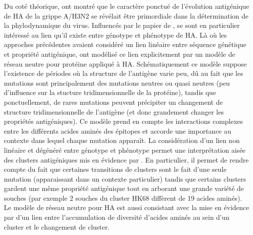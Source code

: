 Du coté théorique, \citet{Koelle2006} ont montré que le caractère
ponctué de l'évolution antigénique de HA de la grippe A/H3N2 se
révélait être primordiale dans la détermination de la phylodynamique
du virus.  Influencés par le papier de \citet{Smith2004},
\citet{Koelle2006} se sont en particulier intéressé au lien qu'il
existe entre génotype et phénotype de HA. Là où les approches
précédentes avaient considéré un lien linéaire entre séquence
génétique et propriété antigénique, \citet{Koelle2006} ont modélisé ce
lien explicitement par un modèle de réseau neutre pour protéine
appliqué à HA. Schématiquement ce modèle suppose l'existence de
périodes où la structure de l'antigène varie peu, dû au fait que les
mutations sont principalement des mutations neutres ou quasi neutres
(peu d'influence sur la stucture tridimensionnelle de la protéine),
tandis que ponctuellement, de rares mutations peuvent précipiter un
changement de structure tridimensionnelle de l'antigène (et donc
grandement changer les propriétés antigéniques). Ce modèle prend en
compte les interactions complexes entre les différents acides aminés
des épitopes et accorde une importance au contexte dans lequel chaque
mutation apparaît. La considération d'un lien non linéaire et dégénéré
entre génotype et phénotype permet une interprétation aisée des
clusters antigéniques mis en évidence par \citet{Smith2004}.  En
particulier, il permet de rendre compte du fait que certaines
transitions de clusters sont le fait d'une seule mutation
(apparaissant dans un contexte particulier) tandis que certains
clusters gardent une même propriété antigénique tout en arborant une
grande variété de souches (par exemple 2 souches du cluster HK68
diffèrent de 19 acides aminés). Le modèle de réseau neutre pour HA est
aussi consistant avec la mise en évidence par \citet{Plotkin2002} d'un
lien entre l'accumulation de diversité d'acides aminés au sein d'un
cluster et le changement de cluster.

